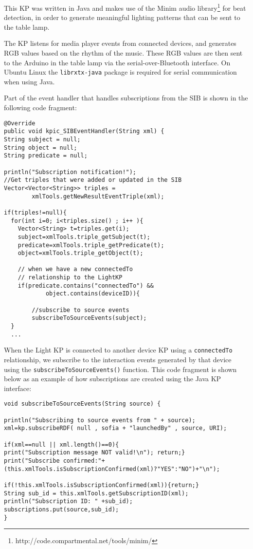 This \ac{KP} was written in Java and makes use of the Minim audio library\footnote{http://code.compartmental.net/tools/minim/} for beat detection, in order to generate meaningful lighting patterns that can be sent to the table lamp.

The \ac{KP} listens for media player events from connected devices, and generates RGB values based on the rhythm of the music. These RGB values are then sent to the Arduino in the table lamp via the serial-over-Bluetooth interface. On Ubuntu Linux the \texttt{librxtx-java} package is required for serial communication when using Java.

Part of the event handler that handles subscriptions from the \ac{SIB} is shown in the following code fragment:

\begin{verbatim}
@Override
public void kpic_SIBEventHandler(String xml) {
String subject = null;
String object = null;
String predicate = null;

println("Subscription notification!");
//Get triples that were added or updated in the SIB
Vector<Vector<String>> triples = 
		xmlTools.getNewResultEventTriple(xml);

if(triples!=null){
  for(int i=0; i<triples.size() ; i++ ){ 
	Vector<String> t=triples.get(i);
	subject=xmlTools.triple_getSubject(t);
	predicate=xmlTools.triple_getPredicate(t);
	object=xmlTools.triple_getObject(t);

	// when we have a new connectedTo 
	// relationship to the LightKP
	if(predicate.contains("connectedTo") && 
			object.contains(deviceID)){

		//subscribe to source events
		subscribeToSourceEvents(subject);
  }
  ...	
\end{verbatim}

When the Light \ac{KP} is connected to another device \ac{KP} using a \texttt{connectedTo} relationship, we subscribe to the interaction events generated by that device using the \texttt{subscribeToSourceEvents()} function. This code fragment is shown below as an example of how subscriptions are created using the Java \ac{KP} interface:

\begin{verbatim}
void subscribeToSourceEvents(String source) {

println("Subscribing to source events from " + source); 
xml=kp.subscribeRDF( null , sofia + "launchedBy" , source, URI);

if(xml==null || xml.length()==0){
print("Subscription message NOT valid!\n"); return;}
print("Subscribe confirmed:"+
(this.xmlTools.isSubscriptionConfirmed(xml)?"YES":"NO")+"\n");

if(!this.xmlTools.isSubscriptionConfirmed(xml)){return;}
String sub_id = this.xmlTools.getSubscriptionID(xml);
println("Subscription ID: " +sub_id);
subscriptions.put(source,sub_id);
}	
\end{verbatim}


